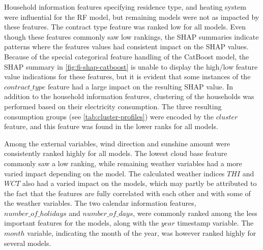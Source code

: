 Household information features specifying residence type, and heating system were influential for the RF model, but remaining models were not as impacted by these features. The contract type feature was ranked low for all models. Even though these features commonly saw low rankings, the SHAP summaries indicate patterns where the features values had consistent impact on the SHAP values. Because of the special categorical feature handling of the CatBoost model, the SHAP summary in \autoref{fig:fi-shap-catboost} is unable to display the high/low feature value indications for these features, but it is evident that some instances of the $contract\_type$ feature had a large impact on the resulting SHAP value. In addition to the household information features, clustering of the households was performed based on their electricity consumption. The three resulting consumption groups (see \autoref{tab:cluster-profiles}) were encoded by the $cluster$ feature, and this feature was found in the lower ranks for all models.

Among the external variables, wind direction and sunshine amount were consistently ranked highly for all models. The lowest cloud base feature commonly saw a low ranking, while remaining weather variables had a more varied impact depending on the model. The calculated weather indices $THI$ and $WCT$ also had a varied impact on the models, which may partly be attributed to the fact that the features are fully correlated with each other and with some of the weather variables. The two calendar information features, $number\_of\_holidays$ and $number\_of\_days$, were commonly ranked among the less important features for the models, along with the $year$ timestamp variable. The $month$ variable, indicating the month of the year, was however ranked highly for several models.
